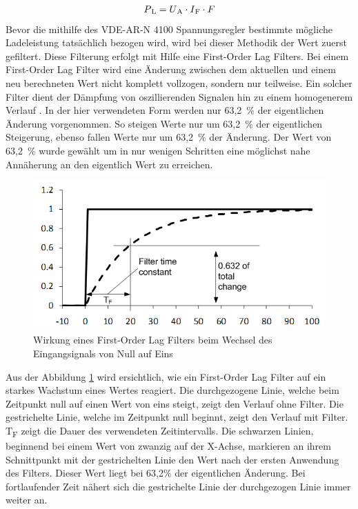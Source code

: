 \begin{align}
	P\textsubscript{L} = U\textsubscript{A} \cdot I\textsubscript{F} \cdot F \label{Main_formula3}
\end{align}
Bevor die mithilfe des VDE-AR-N 4100 Spannungsregler bestimmte mögliche Ladeleistung tatsächlich bezogen wird, wird bei dieser Methodik der Wert zuerst gefiltert. Diese Filterung erfolgt mit Hilfe eine First-Order Lag Filters. Bei einem First-Order Lag Filter wird eine Änderung zwischen dem aktuellen und einem neu berechneten Wert nicht komplett vollzogen, sondern nur teilweise. Ein solcher Filter dient der Dämpfung von oszillierenden Signalen hin zu einem homogenerem Verlauf . In der hier verwendeten Form werden nur 63,2~\% der eigentlichen Änderung vorgenommen. So steigen Werte nur um 63,2~\% der eigentlichen Steigerung, ebenso fallen Werte nur um 63,2~\% der Änderung. Der Wert von 63,2~\% wurde gewählt um in nur wenigen Schritten eine möglichst nahe Annäherung an den eigentlich Wert zu erreichen.
\begin{figure}[htb]
	\includegraphics[scale=0.75]{img/lag_Filter.png}
	\caption{Wirkung eines First-Order Lag Filters beim Wechsel des \newline Eingangsignals von Null auf Eins}
	\label{Abb_lag_filter}
\end{figure}

Aus der Abbildung \ref{Abb_lag_filter} wird ersichtlich, wie ein First-Order Lag Filter auf ein starkes Wachstum eines Wertes reagiert. Die durchgezogene Linie, welche beim Zeitpunkt null auf einen Wert von eins steigt, zeigt den Verlauf ohne Filter. Die gestrichelte Linie, welche im Zeitpunkt null beginnt, zeigt den Verlauf mit Filter. T\textsubscript{F} zeigt die Dauer des verwendeten Zeitintervalls. Die schwarzen Linien, beginnend bei einem Wert von zwanzig auf der X-Achse, markieren an ihrem Schnittpunkt  mit der gestrichelten Linie den Wert nach der ersten Anwendung des Filters. Dieser Wert liegt bei 63,2\% der eigentlichen Änderung. Bei fortlaufender Zeit nähert sich die gestrichelte Linie der durchgezogen Linie immer weiter an.

